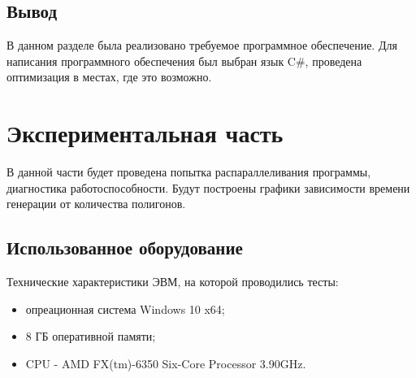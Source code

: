 \documentclass{article}
\begin{document}
	\subsection{Вывод}
	\indent В данном разделе была реализовано требуемое программное обеспечение. Для написания программного обеспечения был выбран язык C\#, проведена оптимизация в местах, где это возможно.

	\newpage
	\section{Экспериментальная часть}
	\indent В данной части будет проведена попытка распараллеливания программы, диагностика работоспособности. Будут построены графики зависимости времени генерации от количества полигонов.
	\subsection{Использованное оборудование}
	Технические характеристики ЭВМ, на которой проводились тесты:
	\begin{itemize}
	\item опреационная система Windows 10 x64;
	\item 8 ГБ оперативной памяти;
	\item CPU - AMD FX(tm)-6350 Six-Core Processor 3.90GHz.
	\end{itemize}
\end{document}
